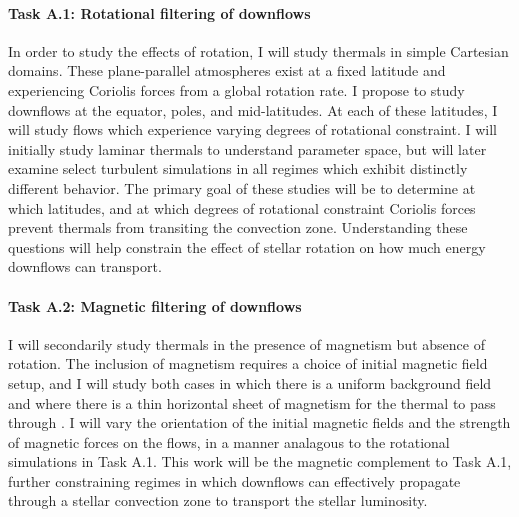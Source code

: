 \documentclass[11pt, preprint]{aastex}
\begin{document}
\vspace{-0.5cm}
\paragraph{Task A.1: Rotational filtering of downflows}
\label{sct:taskA1}
In order to study the effects of rotation, I will study thermals in simple Cartesian domains.
These plane-parallel atmospheres exist at a fixed latitude and experiencing Coriolis forces from a global rotation rate.
I propose to study downflows at the equator, poles, and mid-latitudes.
At each of these latitudes, I will study flows which experience varying degrees of rotational constraint.
I will initially study laminar thermals to understand parameter space, but will later examine select turbulent simulations in all regimes which exhibit distinctly different behavior.
The primary goal of these studies will be to determine at which latitudes, and at which degrees of rotational constraint Coriolis forces prevent thermals from transiting the convection zone.
Understanding these questions will help constrain the effect of stellar rotation on how much energy downflows can transport.

\vspace{-0.5cm}
\paragraph{Task A.2: Magnetic filtering of downflows}
\label{sct:taskA2}
I will secondarily study thermals in the presence of magnetism but absence of rotation.
The inclusion of magnetism requires a choice of initial magnetic field setup, and I will study both cases in which there is a uniform background field and where there is a thin horizontal sheet of magnetism for the thermal to pass through \citep[as in][]{tobias&all1998}.
I will vary the orientation of the initial magnetic fields and the strength of magnetic forces on the flows, in a manner analagous to the rotational simulations in Task A.1.
This work will be the magnetic complement to Task A.1, further constraining regimes in which downflows can effectively propagate through a stellar convection zone to transport the stellar luminosity.


\vspace{-0.5cm}
\end{document}
